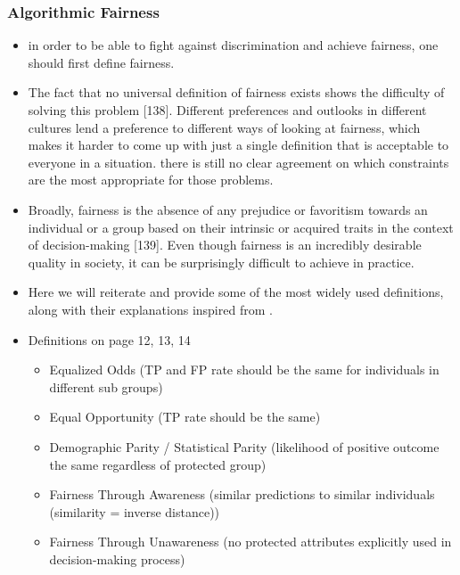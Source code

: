 \documentclass[12pt, a4paper, oneside]{book}   	%
\renewcommand{\paragraph}[1]{%
	\subsubsection*{#1}%
}
\newif\ifrawcitationactive
\newcommand{\rawcitationusedstart}{\color{violet}}
\newcommand{\rawcitationusedend}{%
	\ifrawcitationactive
	\color{purple}  %
	\else
	\color{black}  %
	\fi
}
\begin{document}
			\paragraph{Algorithmic Fairness}
			\begin{itemize}
				\rawcitationusedstart	
				\item in order to be able to fight against discrimination and achieve fairness, one should first define fairness. \autocite{Mehrabi_2021}
				\item The fact that no universal definition of fairness exists shows the difficulty of solving this problem [138]. Different preferences and outlooks in different cultures lend a preference to different ways of looking at fairness, which makes it harder to come up with just a single definition that is acceptable to everyone in a situation. there is still no clear agreement on which constraints are the most appropriate for those problems. \autocite{Mehrabi_2021}
				\item Broadly, fairness is the absence of any prejudice or favoritism towards an individual or a group based on their intrinsic or acquired traits in the context of decision-making [139]. Even though fairness is an incredibly desirable quality in society, it can be surprisingly difficult to achieve in practice. \autocite{Mehrabi_2021}
				\rawcitationusedend
				\item Here we will reiterate and provide some of the most widely used definitions, along with their explanations inspired from \autocite{M149_Verma_2018}.\autocite{Mehrabi_2021}
				\rawcitationusedstart
				\item Definitions on page 12, 13, 14 \autocite{Mehrabi_2021}
				\begin{itemize}
					\item Equalized Odds (TP and FP rate should be the same for individuals in different sub groups) \autocite{Mehrabi_2021}
					\item Equal Opportunity (TP rate should be the same) \autocite{Mehrabi_2021}
					\item Demographic Parity / Statistical Parity (likelihood of positive outcome the same regardless of protected group) \autocite{Mehrabi_2021}
					\item Fairness Through Awareness (similar predictions to similar individuals (similarity = inverse distance)) \autocite{Mehrabi_2021}
					\item Fairness Through Unawareness (no protected attributes explicitly used in decision-making process) \autocite{Mehrabi_2021}

\end{itemize}
\end{itemize}
\end{document}

